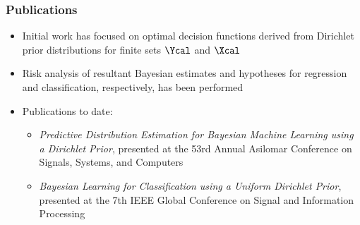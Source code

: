 \documentclass[aspectratio=169,usenames,dvipsnames]{beamer}
\begin{document}
\begin{frame} 
\frametitle{Publications}

\begin{itemize}
\item Initial work has focused on optimal decision functions derived from Dirichlet prior distributions for finite sets $\Ycal$ and $\Xcal$
\vspace{0.5em}
\item Risk analysis of resultant Bayesian estimates and hypotheses for regression and classification, respectively, has been performed
\vspace{0.5em}
\item \alert{Publications to date}:
	\vspace{0.25em}
	\begin{itemize}
	\item \emph{Predictive Distribution Estimation for Bayesian Machine Learning using a Dirichlet Prior}, presented at 	the 53rd Annual Asilomar Conference on Signals, Systems, and Computers
	\vspace{0.25em}
	\item \emph{Bayesian Learning for Classification using a Uniform Dirichlet Prior}, presented at the 7th IEEE Global Conference on Signal and Information Processing
	\end{itemize}
\end{itemize}

\end{frame}
\end{document}
